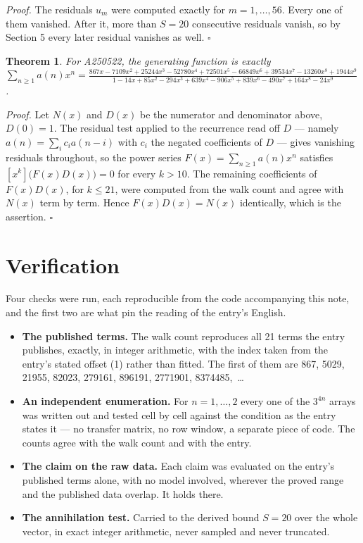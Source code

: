 \documentclass[11pt]{article}
\newtheorem{theorem}{Theorem}
\theoremstyle{definition}
\begin{document}
{\itshape Proof.} The residuals $u_m$ were computed exactly for $m = 1,\dots,56$. Every one of them vanished. After it, more than $S = 20$ consecutive residuals vanish, so by Section 5 every later residual vanishes as well. $\square$

\begin{theorem} For A250522, the generating function is exactly $\sum_{n\ge 1} a(n)x^n = \frac{867x - 7109x^{2} + 25244x^{3} - 52780x^{4} + 72501x^{5} - 66849x^{6} + 39534x^{7} - 13260x^{8} + 1944x^{9}}{1 - 14x + 85x^{2} - 294x^{3} + 639x^{4} - 906x^{5} + 839x^{6} - 490x^{7} + 164x^{8} - 24x^{9}}$.\end{theorem}

{\itshape Proof.} Let $N(x)$ and $D(x)$ be the numerator and denominator above, $D(0)=1$. The residual test applied to the recurrence read off $D$ --- namely $a(n) = \sum_i c_i a(n-i)$ with $c_i$ the negated coefficients of $D$ --- gives vanishing residuals throughout, so the power series $F(x)=\sum_{n\ge 1}a(n)x^n$ satisfies $[x^k]\bigl(F(x)D(x)\bigr) = 0$ for every $k > 10$. The remaining coefficients of $F(x)D(x)$, for $k \le 21$, were computed from the walk count and agree with $N(x)$ term by term. Hence $F(x)D(x) = N(x)$ identically, which is the assertion. $\square$

\section{Verification}

Four checks were run, each reproducible from the code accompanying this note, and the first two are what pin the reading of the entry's English.

\begin{itemize}

\item {\bfseries The published terms.} The walk count reproduces all 21 terms the entry publishes, exactly, in integer arithmetic, with the index taken from the entry's stated offset (1) rather than fitted. The first of them are 867, 5029, 21955, 82023, 279161, 896191, 2771901, 8374485,~\dots

\item {\bfseries An independent enumeration.} For $n = 1,\dots,2$ every one of the $3^{4n}$ arrays was written out and tested cell by cell against the condition as the entry states it --- no transfer matrix, no row window, a separate piece of code. The counts agree with the walk count and with the entry.

\item {\bfseries The claim on the raw data.} Each claim was evaluated on the entry's published terms alone, with no model involved, wherever the proved range and the published data overlap. It holds there.

\item {\bfseries The annihilation test.} Carried to the derived bound $S = 20$ over the whole vector, in exact integer arithmetic, never sampled and never truncated.

\end{itemize}
\end{document}
